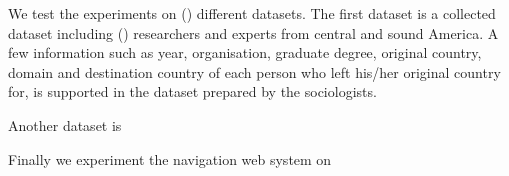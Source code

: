 We test the experiments on () different datasets.  The first dataset is a collected dataset including ()  researchers and experts from central and sound America. A few information such as year, organisation, graduate degree, original country, domain and destination country of each person who left his/her original country for, is supported in the dataset prepared by the sociologists. 

Another dataset is 

Finally we experiment the navigation web system on 